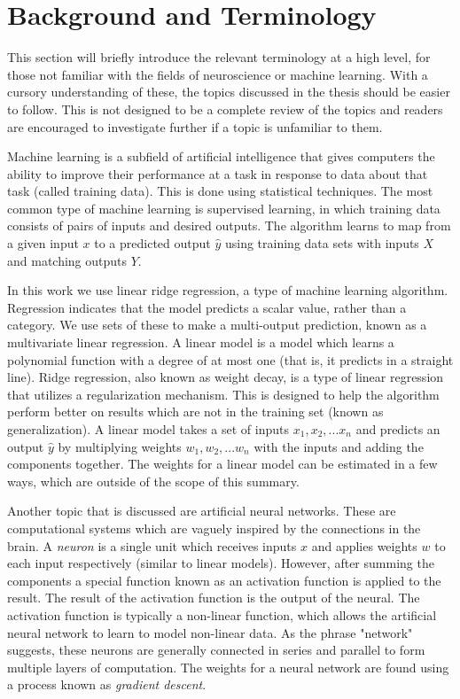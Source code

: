 \section{Background and Terminology}

This section will briefly introduce the relevant terminology at a high level, 
for those not familiar with the fields of neuroscience or machine learning.  
With a cursory understanding of these, the topics discussed in the thesis 
should be easier to follow. This is not designed to be a complete review of the 
topics and readers are encouraged to investigate further if a topic is 
unfamiliar to them.

Machine learning is a subfield of artificial intelligence that gives computers 
the ability to improve their performance at a task in response to data about 
that task (called training data). This is done using statistical techniques.  
The most common type of machine learning is supervised learning, in which 
training data consists of pairs of inputs and desired outputs. The algorithm 
learns to map from a given input $x$ to a predicted output $\hat{y}$ using 
training data sets with inputs $X$ and matching outputs $Y$.

In this work we use linear ridge regression, a type of machine learning 
algorithm. Regression indicates that the model predicts a scalar value, rather 
than a category. We use sets of these to make a multi-output prediction, known 
as a multivariate linear regression. A linear model is a model which learns a 
polynomial function with a degree of at most one (that is, it predicts in a 
straight line). Ridge regression, also known as weight decay, is a type of 
linear regression that utilizes a regularization mechanism. This is designed to 
help the algorithm perform better on results which are not in the training set 
(known as generalization). A linear model takes a set of inputs $x_1, x_2, ...  
x_n$ and predicts an output $\hat{y}$ by multiplying weights $w_1, w_2, ...  
w_n$ with the inputs and adding the components together. The weights for a 
linear model can be estimated in a few ways, which are outside of the scope of 
this summary.

Another topic that is discussed are artificial neural networks. These are 
computational systems which are vaguely inspired by the connections in the 
brain. A \emph{neuron} is a single unit which receives inputs $x$ and applies 
weights $w$ to each input respectively (similar to linear models). However, 
after summing the components a special function known as an activation function 
is applied to the result. The result of the activation function is the output 
of the neural. The activation function is typically a non-linear function, 
which allows the artificial neural network to learn to model non-linear data.  
As the phrase "network" suggests, these neurons are generally connected in 
series and parallel to form multiple layers of computation. The weights for a 
neural network are found using a process known as \emph{gradient descent}. 

